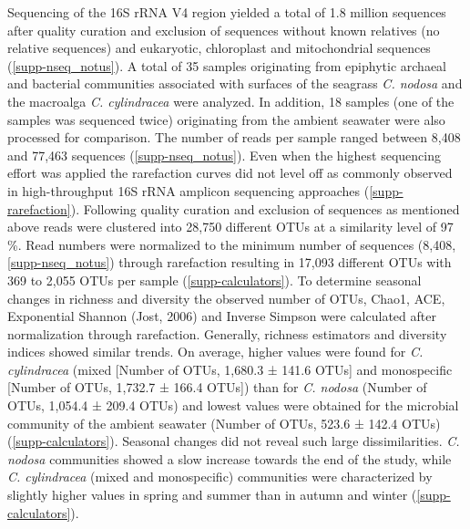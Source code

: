\documentclass[12pt,]{article}
\begin{document}
Sequencing of the 16S rRNA V4 region yielded a total of 1.8 million
sequences after quality curation and exclusion of sequences without
known relatives (no relative sequences) and eukaryotic, chloroplast and
mitochondrial sequences (\autoref{supp-nseq_notus}). A total of 35
samples originating from epiphytic archaeal and bacterial communities
associated with surfaces of the seagrass \emph{C. nodosa} and the
macroalga \emph{C. cylindracea} were analyzed. In addition, 18 samples
(one of the samples was sequenced twice) originating from the ambient
seawater were also processed for comparison. The number of reads per
sample ranged between 8,408 and 77,463 sequences
(\autoref{supp-nseq_notus}). Even when the highest sequencing effort was
applied the rarefaction curves did not level off as commonly observed in
high-throughput 16S rRNA amplicon sequencing approaches
(\autoref{supp-rarefaction}). Following quality curation and exclusion
of sequences as mentioned above reads were clustered into 28,750
different OTUs at a similarity level of 97 \si{\percent}. Read numbers
were normalized to the minimum number of sequences (8,408,
\autoref{supp-nseq_notus}) through rarefaction resulting in 17,093
different OTUs with 369 to 2,055 OTUs per sample
(\autoref{supp-calculators}). To determine seasonal changes in richness
and diversity the observed number of OTUs, Chao1, ACE, Exponential
Shannon (Jost, 2006) and Inverse Simpson were calculated after
normalization through rarefaction. Generally, richness estimators and
diversity indices showed similar trends. On average, higher values were
found for \emph{C. cylindracea} (mixed {[}Number of OTUs, 1,680.3 ±
141.6 OTUs{]} and monospecific {[}Number of OTUs, 1,732.7 ± 166.4
OTUs{]}) than for \emph{C. nodosa} (Number of OTUs, 1,054.4 ± 209.4
OTUs) and lowest values were obtained for the microbial community of the
ambient seawater (Number of OTUs, 523.6 ± 142.4 OTUs)
(\autoref{supp-calculators}). Seasonal changes did not reveal such large
dissimilarities. \emph{C. nodosa} communities showed a slow increase
towards the end of the study, while \emph{C. cylindracea} (mixed and
monospecific) communities were characterized by slightly higher values
in spring and summer than in autumn and winter
(\autoref{supp-calculators}).
\end{document}
